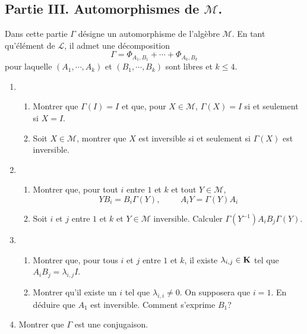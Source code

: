 \subsection*{Partie III. Automorphismes de $\mathcal{M}$.}
Dans cette partie $\Gamma$ désigne un automorphisme de l'algèbre $\mathcal{M}$. En tant qu'élément de $\mathcal{L}$, il admet une décomposition
\begin{displaymath}
 \Gamma = \Phi_{A_1,B_1} + \cdots + \Phi_{A_k,B_k}
\end{displaymath}
pour laquelle $(A_1,\cdots,A_k)$ et $(B_1,\cdots,B_k)$ sont libres et $k\leq 4$.
\begin{enumerate}
 \item 
\begin{enumerate}
 \item Montrer que $\Gamma(I)=I$ et que, pour $X\in \mathcal{M}$, $\Gamma(X)=I$ si et seulement si $X=I$.
 \item Soit $X\in \mathcal{M}$, montrer que $X$ est inversible si et seulement si $\Gamma(X)$ est inversible. 
\end{enumerate}
\item
\begin{enumerate}
 \item  Montrer que, pour tout $i$ entre $1$ et $k$ et tout $Y\in\mathcal M$,
\begin{displaymath}
 YB_i=B_i\Gamma(Y), \hspace{1cm} A_iY=\Gamma(Y)A_i
\end{displaymath}
\item Soit $i$ et $j$ entre $1$ et $k$ et $Y\in \mathcal{M}$ inversible. Calculer $\Gamma(Y^{-1})A_iB_j\Gamma(Y)$.
\end{enumerate}
 \item
\begin{enumerate}
 \item  Montrer que, pour tous $i$ et $j$ entre $1$ et $k$, il existe $\lambda_{i,j}\in\mathbf{K}$ tel que $A_iB_j= \lambda_{i,j} I$.
 \item Montrer qu'il existe un $i$ tel que $\lambda_{i,i}\neq 0$. On supposera que $i=1$. En déduire que $A_1$ est inversible. Comment s'exprime $B_1$?
\end{enumerate}
\item Montrer que $\Gamma$ est une conjugaison.
\end{enumerate}
